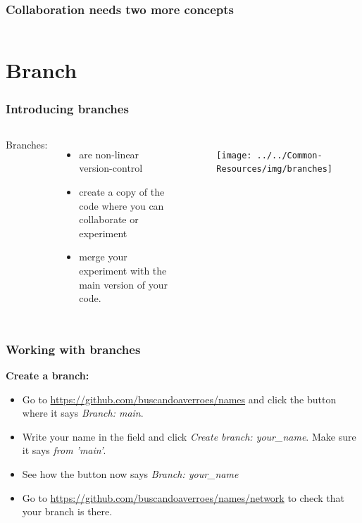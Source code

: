 \documentclass[aspectratio=169]{beamer} %
\newcommand{\trainingURL}[1]{{\color{blue}\url{#1}}}
\newcommand{\traininerUsername}{buscandoaverroes}
\newcommand{\repoName}{\traininerUsername/names}
\newcommand{\trainingRepoURL}[1]{\trainingURL{https://github.com/\repoName #1}}
\begin{document}
\begin{frame}
\frametitle{Collaboration needs two more concepts}


	\vspace{1cm}

	\begin{columns}[c]



	\end{columns}

	\vspace{2cm}

\end{frame}

\section{Branch}

\begin{frame}
\frametitle{Introducing branches}

	\begin{columns}[c]

		\column{.40\textwidth}
		Branches:
		\begin{itemize}
			\item are non-linear version-control
			\item create a copy of the code where you can collaborate or experiment
			\item merge your experiment with the main version of your code.
		\end{itemize}

		\column{.40\textwidth}
		\begin{figure}
			\centering
			\texttt{[image: ../../Common-Resources/img/branches]}
			\label{fig:branches}
		\end{figure}

	\end{columns}

\end{frame}

\begin{frame}
\frametitle{Working with branches}


	\textbf{Create a branch:}
	\begin{itemize}
		\item Go to \trainingRepoURL{} and click the button where it says \textit{Branch: main}.
		\item Write your name in the field and click \textit{Create branch: your\_name}. Make sure it says \textit{from 'main'}.
		\item See how the button now says \textit{Branch: your\_name}
		\item Go to \trainingRepoURL{/network} to check that your branch is there.
	\end{itemize}

\end{frame}
\end{document}
